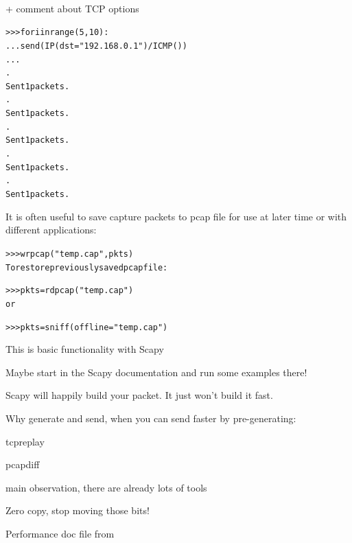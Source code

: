 \documentclass[Screen16to9,17pt]{foils}
\begin{document}

\inputminted[fontsize=\small,  breaklines]{perl}{files/junos-crash.pl}
{\small{}}



\inputminted[fontsize=\small,  breaklines]{python}{files/junos-crash.py}
{\small
{}}\\
+ comment about TCP options



\begin{alltt}
>>> for i in range (5,10):
...       send(IP(dst="192.168.0.1")/ICMP())
...
.
Sent 1 packets.
.
Sent 1 packets.
.
Sent 1 packets.
.
Sent 1 packets.
.
Sent 1 packets.
\end{alltt}

It is often useful to save capture packets to pcap file for use at later time or with different applications:

\begin{alltt}
>>> wrpcap("temp.cap",pkts)
To restore previously saved pcap file:

>>> pkts = rdpcap("temp.cap")
or

>>> pkts = sniff(offline="temp.cap")
\end{alltt}

This is basic functionality with Scapy

Maybe start in the Scapy documentation and run some examples there!


Scapy will happily build your packet. It just won't build it fast.
\begin{list1}
\item Why generate and send, when you can send faster by pre-generating:
\item  tcpreplay 
\item  pcapdiff 
\item  main observation, there are already lots of tools
\end{list1}


\begin{list1}
\item Zero copy, stop moving those bits!
\item Performance doc file from 
\end{list1}
\end{document}
